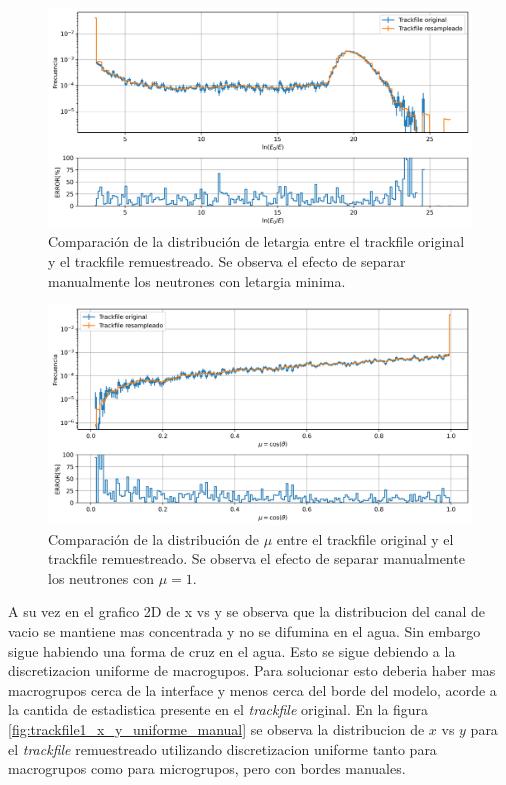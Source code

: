 \begin{figure}[H]
    \centering
    \includegraphics[width=\textwidth]{figs/fig4_7.png}
    \caption{Comparación de la distribución de letargia entre el trackfile original y el trackfile remuestreado. Se observa el efecto de separar manualmente los neutrones con letargia minima.}
    \label{fig:trackfile1_config1_letargia_manual}
\end{figure}

\begin{figure}[H]
    \centering
    \includegraphics[width=\textwidth]{figs/fig4_8.png}
    \caption{Comparación de la distribución de $\mu$ entre el trackfile original y el trackfile remuestreado. Se observa el efecto de separar manualmente los neutrones con $\mu = 1$.}
    \label{fig:trackfile1_config1_mu_manual}
\end{figure}

A su vez en el grafico 2D de x vs y se observa que la distribucion del canal de vacio se mantiene mas concentrada y no se difumina en el agua. Sin embargo sigue habiendo una forma de cruz en el agua. Esto se sigue debiendo a la discretizacion uniforme de macrogupos. Para solucionar esto deberia haber mas macrogrupos cerca de la interface y menos cerca del borde del modelo, acorde a la cantida de estadistica presente en el \emph{trackfile} original. En la figura \ref{fig:trackfile1_x_y_uniforme_manual} se observa la distribucion de $x$ vs $y$ para el \emph{trackfile} remuestreado utilizando discretizacion uniforme tanto para macrogrupos como para microgrupos, pero con bordes manuales. 

